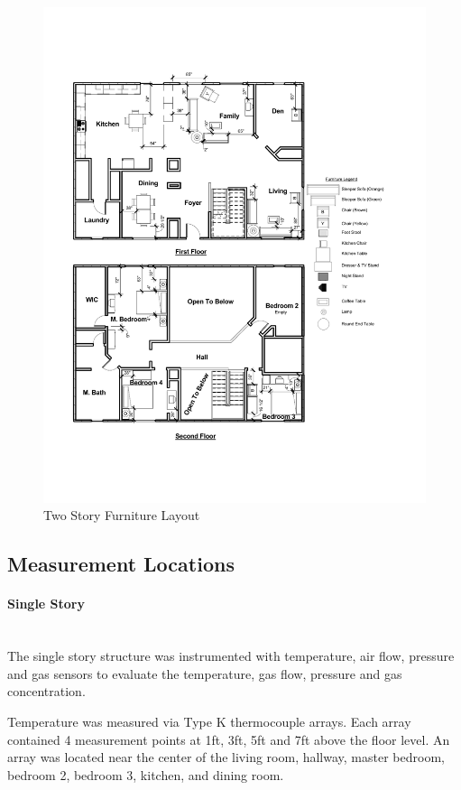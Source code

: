 \documentclass{article}
\begin{document}
\begin{figure}[H]
	\centering
	\includegraphics[width=\textwidth]{0_Images/Furniture/Two_Story_Furniture_Layout.pdf}
	\caption{Two Story Furniture Layout}
	\label{fig:TwoStoryFurniture}
\end{figure}

\subsection{Measurement Locations}

\paragraph{Single Story} \mbox{}\\
The single story structure was instrumented with temperature, air flow, pressure and gas sensors to evaluate the temperature, gas flow, pressure and gas concentration. 

Temperature was measured via Type K thermocouple arrays. Each array contained 4 measurement points at 1ft, 3ft, 5ft and 7ft above the floor level. An array was located near the center of the living room, hallway, master bedroom, bedroom 2, bedroom 3, kitchen, and dining room.    
\end{document}
